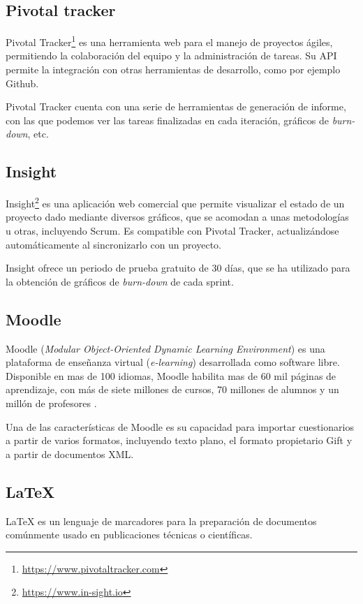 \subsection{Pivotal tracker}
Pivotal Tracker\footnote{\url{https://www.pivotaltracker.com}} es una herramienta web para el manejo de proyectos ágiles, permitiendo la colaboración del equipo y la administración de tareas.
Su API permite la integración con otras herramientas de desarrollo, como por ejemplo Github.

Pivotal Tracker cuenta con una serie de herramientas de generación de informe, con las que podemos ver las tareas finalizadas en cada iteración, gráficos de \emph{burn-down}, etc.

\subsection{Insight}
Insight\footnote{\url{https://www.in-sight.io}} es una aplicación web comercial que permite visualizar el estado de un proyecto dado mediante diversos gráficos, que se acomodan a unas metodologías u otras, incluyendo Scrum.
Es compatible con Pivotal Tracker, actualizándose automáticamente al sincronizarlo con un proyecto.

Insight ofrece un periodo de prueba gratuito de 30 días, que se ha utilizado para la obtención de gráficos de \emph{burn-down} de cada sprint.

\subsection{Moodle}
Moodle (\emph{Modular Object-Oriented Dynamic Learning Environment}) es una plataforma de enseñanza virtual (\emph{e-learning}) desarrollada como software libre.
Disponible en mas de 100 idiomas, Moodle habilita mas de 60 mil páginas de aprendizaje, con más de siete millones de cursos, 70 millones de alumnos y un millón de profesores \cite{website:moodle}.

Una de las características de Moodle es su capacidad para importar cuestionarios a partir de varios formatos, incluyendo texto plano, el formato propietario Gift y a partir de documentos XML.

\subsection{\LaTeX{}}
\LaTeX{} es un lenguaje de marcadores para la preparación de documentos comúnmente usado en publicaciones técnicas o científicas.

